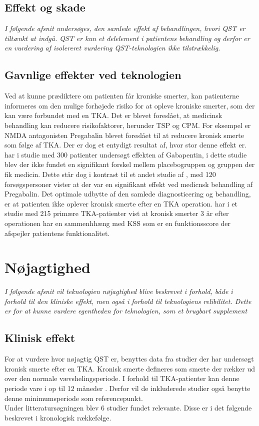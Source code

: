 \subsection{Effekt og skade}
\textit{I følgende afsnit undersøges, den samlede effekt af behandlingen, hvori QST er tiltænkt at indgå. QST er kun et delelement i patientens behandling og  derfor er en vurdering af isolereret vurdering QST-teknologien ikke tilstrækkelig.}


\subsection{Gavnlige effekter ved teknologien}
Ved at kunne prædiktere om patienten får kroniske smerter, kan patienterne informeres om den mulige forhøjede risiko for at opleve  kroniske smerter, som der kan være forbundet med en TKA. Det er blevet foreslået, at medicinsk behandling kan reducere risikofaktorer, herunder TSP og CPM. For eksempel er NMDA antagonisten Pregabalin blevet foreslået til at reducere kronisk smerte som følge af TKA. Der er dog et entydigt resultat af, hvor stor denne effekt er.  har i studie med 300 patienter undersøgt effekten af Gabapentin, i dette studie blev der ikke fundet en signifikant forskel mellem placebogruppen og gruppen der fik medicin. Dette står dog i kontrast til et andet studie af , med 120 forsøgspersoner vister at der var en signifikant effekt ved medicnsk behandling af Pregabalin. 
Det optimale udbytte af den samlede diagnosticering og behandling, er at patienten ikke oplever kronisk smerte efter en TKA operation.  har i et studie med 215 primære TKA-patienter vist at kronisk smerter 3 år efter operationen har en sammenhhæng med KSS som er en funktionsscore der afspejler patientens funktionalitet.



\section{Nøjagtighed}
\textit{I følgende afsnit vil teknologien nøjagtighed blive beskrevet i forhold, både i forhold til den kliniske effekt, men også i forhold til teknologiens relibilitet. Dette er for at kunne vurdere egentheden for teknologien, som et brugbart supplement }
\subsection{Klinisk effekt}
For at vurdere hvor nøjagtig QST er, benyttes data fra studier der har undersøgt kronisk smerte efter en TKA. Kronisk smerte defineres som smerte der rækker ud over den normale vævshelingsperiode.  I forhold til TKA-patienter kan denne periode vare i op til  12 måneder \citep{Wylde2016review}. Derfor vil de inkluderede studier også benytte denne minimumsperiode som referencepunkt. \\
Under litteratursøgningen blev 6 studier fundet relevante. Disse er i det følgende beskrevet i kronologisk rækkefølge.

